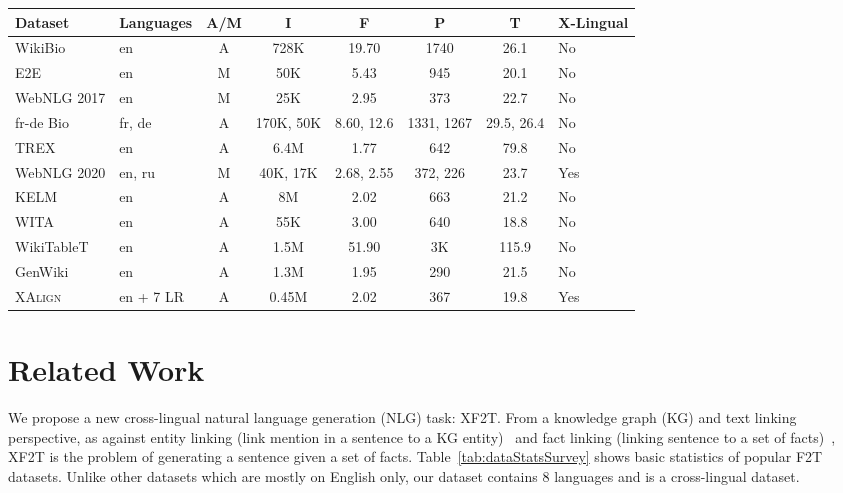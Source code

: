 \documentclass[11pt]{article}
\def\langCount{8}
\def\lrLangCount{7}
\begin{document}
\begin{table*}[!t]
    \centering
    \scriptsize
    \begin{tabular}{|l|l|c|c|c|c|c|l|}
    \hline
Dataset&Languages&A/M&I&F&P&T&X-Lingual\\
\hline
\hline
WikiBio&en&A&728K&19.70&1740&26.1&No\\
\hline
E2E&en&M&50K&5.43&945&20.1&No\\
\hline
WebNLG 2017&en&M&25K&2.95&373&22.7&No\\
\hline
fr-de Bio&fr, de&A&170K, 50K&8.60, 12.6&1331, 1267&29.5, 26.4&No\\
\hline
TREX&en&A&6.4M&1.77&642&79.8&No\\
\hline
WebNLG 2020&en, ru&M&40K, 17K&2.68, 2.55&372, 226&23.7 &Yes\\
\hline
KELM&en&A&8M&2.02&663&21.2&No\\
\hline
WITA&en&A&55K&3.00&640&18.8&No\\
\hline
WikiTableT&en&A&1.5M&51.90&3K&115.9&No\\
\hline
GenWiki&en&A&1.3M&1.95&290&21.5&No\\
\hline
\hline
\textsc{XAlign}&en + \lrLangCount{} LR&A&0.45M&2.02&367&19.8&Yes\\
\hline
    \end{tabular}
    \caption{Statistics of popular F2T datasets: WikiBio~\cite{lebret2016wikibio}, E2E~\cite{novikova2017e2e}, WebNLG 2017~\cite{gardent2017webnlg}, WebNLG 2020~\cite{castro-ferreira-etal-2020-2020}, fr-de Bio~\cite{nema2018generating}, KELM~\cite{agarwal2021knowledge}, WITA~\cite{fu2020partially}, WikiTableT~\cite{chen2021wikitablet}, GenWiki~\cite{jin2020genwiki}, TREX~\cite{elsahar2018trex}, and XAlign (ours). Alignment method could be A (automatic) or M (manual). I=number of instances, F=avg fact count, P=number of unique predicates, T=avg word count.}
    \label{tab:dataStatsSurvey}
\end{table*}

\section{Related Work}
\label{sec:related}

We propose a new cross-lingual natural language generation (NLG) task: XF2T. From a knowledge graph (KG) and text linking perspective, as against entity linking (link mention in a sentence to a KG entity)~\cite{botha2020entity} and fact linking (linking sentence to a set of facts)~\cite{kolluru2021multilingual}, XF2T is the problem of generating a sentence given a set of facts. Table~\ref{tab:dataStatsSurvey} shows basic statistics of popular F2T datasets. Unlike other datasets which are mostly on English only, our dataset contains \langCount{} languages and is a cross-lingual dataset. 
\end{document}
